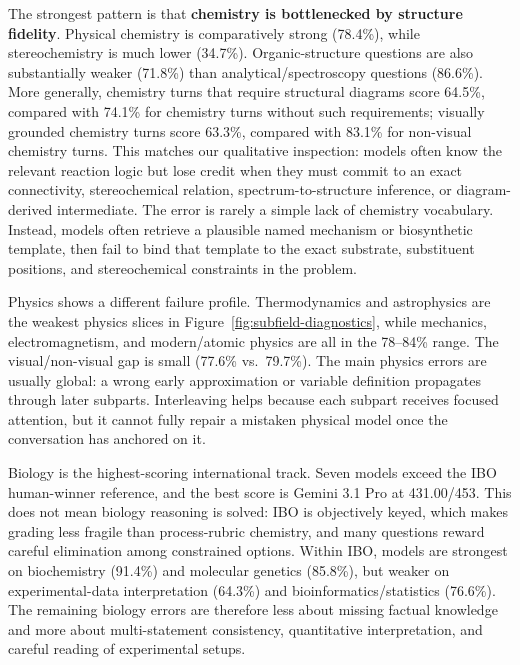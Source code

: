 \documentclass[11pt]{article}
\begin{document}
The strongest pattern is that \textbf{chemistry is bottlenecked by structure fidelity}.
Physical chemistry is comparatively strong (78.4\%), while stereochemistry is much lower (34.7\%).
Organic-structure questions are also substantially weaker (71.8\%) than analytical/spectroscopy questions (86.6\%).
More generally, chemistry turns that require structural diagrams score 64.5\%, compared with 74.1\% for chemistry turns without such requirements; visually grounded chemistry turns score 63.3\%, compared with 83.1\% for non-visual chemistry turns.
This matches our qualitative inspection: models often know the relevant reaction logic but lose credit when they must commit to an exact connectivity, stereochemical relation, spectrum-to-structure inference, or diagram-derived intermediate.
The error is rarely a simple lack of chemistry vocabulary.
Instead, models often retrieve a plausible named mechanism or biosynthetic template, then fail to bind that template to the exact substrate, substituent positions, and stereochemical constraints in the problem.

Physics shows a different failure profile.
Thermodynamics and astrophysics are the weakest physics slices in Figure~\ref{fig:subfield-diagnostics}, while mechanics, electromagnetism, and modern/atomic physics are all in the 78--84\% range.
The visual/non-visual gap is small (77.6\% vs.\ 79.7\%).
The main physics errors are usually global: a wrong early approximation or variable definition propagates through later subparts.
Interleaving helps because each subpart receives focused attention, but it cannot fully repair a mistaken physical model once the conversation has anchored on it.

Biology is the highest-scoring international track.
Seven models exceed the IBO human-winner reference, and the best score is Gemini 3.1 Pro at 431.00/453.
This does not mean biology reasoning is solved: IBO is objectively keyed, which makes grading less fragile than process-rubric chemistry, and many questions reward careful elimination among constrained options.
Within IBO, models are strongest on biochemistry (91.4\%) and molecular genetics (85.8\%), but weaker on experimental-data interpretation (64.3\%) and bioinformatics/statistics (76.6\%).
The remaining biology errors are therefore less about missing factual knowledge and more about multi-statement consistency, quantitative interpretation, and careful reading of experimental setups.
\end{document}
